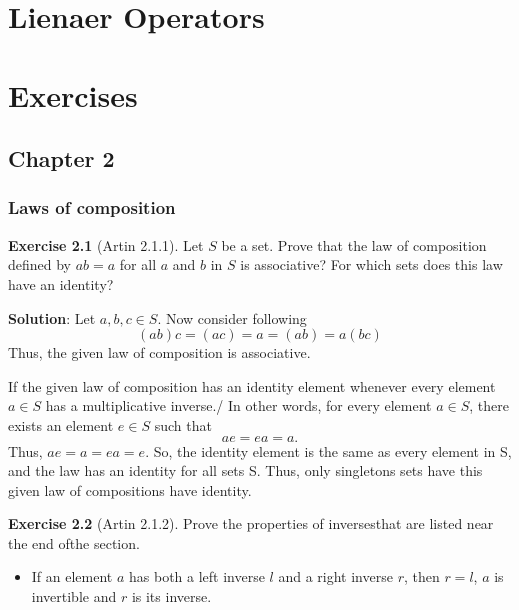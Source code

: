 \documentclass[
]{book}
\providecommand{\tightlist}{%
  \setlength{\itemsep}{0pt}\setlength{\parskip}{0pt}}
\theoremstyle{definition}
\theoremstyle{definition}
\theoremstyle{definition}
\newtheorem{exercise}{Exercise}[chapter]
\theoremstyle{definition}
\theoremstyle{remark}
\begin{document}
\hypertarget{lienaer-operators}{%
\chapter{Lienaer Operators}\label{lienaer-operators}}

\hypertarget{exercises}{%
\chapter{Exercises}\label{exercises}}

\hypertarget{chapter-2}{%
\section{Chapter 2}\label{chapter-2}}

\hypertarget{laws-of-composition}{%
\subsection{Laws of composition}\label{laws-of-composition}}

\begin{exercise}[Artin 2.1.1]
\protect\hypertarget{exr:unnamed-chunk-64}{}\label{exr:unnamed-chunk-64}Let \(S\) be a set. Prove that the law of composition defined by \(ab = a\) for all \(a\) and \(b\) in \(S\) is associative? For which sets does this law have an identity?
\end{exercise}

\textbf{Solution}: Let \(a,b,c\in S\).
Now consider following
\[(ab)c=(ac)=a=(ab)=a(bc)\]
Thus, the given law of composition is associative.

If the given law of composition has an identity element whenever every element \(a\in S\) has a multiplicative inverse./
In other words, for every element \(a\in S\), there exists an element \(e \in S\) such that \[ae = ea = a.\]
Thus, \(ae=a=ea=e\). So, the identity element is the same as every element in S, and the law has an identity for all sets S. Thus, only singletons sets have this given law of compositions have identity.

\begin{exercise}[Artin 2.1.2]
\protect\hypertarget{exr:unnamed-chunk-65}{}\label{exr:unnamed-chunk-65}Prove the properties of inversesthat are listed near the end ofthe section.
\end{exercise}

\begin{itemize}
\tightlist
\item
  If an element \(a\) has both a left inverse \(l\) and a right inverse \(r\), then \(r = l\), \(a\) is invertible and \(r\) is its inverse.
\end{itemize}
\end{document}
